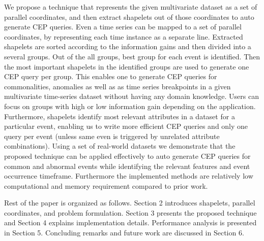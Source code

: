 \documentclass[conference]{IEEEtran}  %
\begin{document}
We propose a technique that represents the given multivariate dataset as a set of parallel coordinates, and then extract shapelets out of those coordinates to auto generate CEP queries. Even a time series can be mapped to a set of parallel coordinates, by representing each time instance as a separate line. Extracted shapelets are sorted according to the information gains and then divided into a several groups. Out of the all groups, best group for each event is identified. Then the most important shapelets in the identified groups are used to generate one CEP query per group. This enables one to generate CEP queries for commonalities, anomalies as well as as time series breakpoints in a given multivariate time-series dataset without having any domain knowledge. Users can focus on groups with high or low information gain depending on the application. Furthermore, shapelets identify most relevant attributes in a dataset for a particular event, enabling us to write more efficient CEP queries and only one query per event (unless same even is triggered by unrelated attribute combinations). Using a set of real-world datasets we demonstrate that the proposed technique can be applied effectively to auto generate CEP queries for common and abnormal events while identifying the relevant features and event occurrence timeframe. Furthermore the implemented methods are relatively low computational and memory requirement compared to prior work.

Rest of the paper is organized as follows. Section 2 introduces shapelets, parallel coordinates, and problem formulation. Section 3 presents the proposed technique and Section 4 explains implementation details. Performance analysis is presented in Section 5. Concluding remarks and future work are discussed in Section 6.
\end{document}
